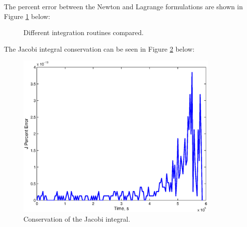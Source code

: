 \documentclass[]{aiaa-tc}%
\begin{document}
The percent error between the Newton and Lagrange formulations are shown in Figure \ref{fig:Orb_ex_errors} below:
	\begin{figure}[H]
		\centering
	\caption{Different integration routines compared. }
		\label{fig:Orb_ex_errors}
	\end{figure}

The Jacobi integral conservation can be seen in Figure \ref{fig:Jacobi_conserved} below:
	\begin{figure}[H]
		\centering
			\includegraphics[width = 10cm]{Figures/J_conserved.eps}
	\caption{Conservation of the Jacobi integral. }
		\label{fig:Jacobi_conserved}
	\end{figure}
\end{document}
